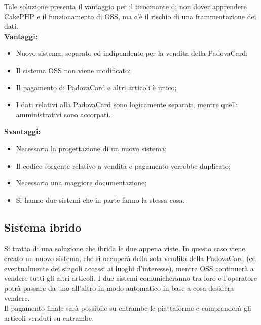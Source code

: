 Tale soluzione presenta il vantaggio per il tirocinante di non dover apprendere CakePHP e il funzionamento di OSS, ma c'è il rischio di una frammentazione dei dati. \\
\textbf{Vantaggi:}
\begin{itemize}
\item Nuovo sistema, separato ed indipendente per la vendita della PadovaCard;
\item Il sistema OSS non viene modificato;
\item Il pagamento di PadovaCard e altri articoli è unico;
\item I dati relativi alla PadovaCard sono logicamente separati, mentre quelli amministrativi sono accorpati.
\end{itemize}
\textbf{Svantaggi:}
\begin{itemize}
\item Necessaria la progettazione di un nuovo sistema;
\item Il codice sorgente relativo a vendita e pagamento verrebbe duplicato;
\item Necessaria una maggiore documentazione;
\item Si hanno due sistemi che in parte fanno la stessa cosa.
\end{itemize}

\subsection{Sistema ibrido}
Si tratta di una soluzione che ibrida le due appena viste. In questo caso viene creato un nuovo sistema, che si occuperà della sola vendita della PadovaCard (ed eventualmente dei singoli accessi ai luoghi d'interesse), mentre OSS continuerà a vendere tutti gli altri articoli. 
I due sistemi comunicheranno tra loro e l'operatore potrà passare da uno all'altro in modo automatico in base a cosa desidera vendere. \\

Il pagamento finale sarà possibile su entrambe le piattaforme e comprenderà gli articoli venduti su entrambe.


